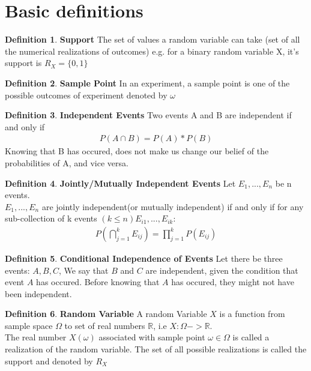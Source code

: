\documentclass[10pt,a4paper]{article}
\newcommand{\R}{\mathbb{R}}
\begin{document}
\theoremstyle{definition}
\newtheorem{defn}{Definition}[section]


	\section{Basic definitions}

	\begin{defn}{\textbf{Support}}
		The set of values a random variable can take (set of all the numerical realizations of outcomes) e.g. for a binary random variable X, it's support is $R_X = \{ 0, 1 \}$
	\end{defn}


	\begin{defn}{\textbf{Sample Point}}
		In an experiment, a sample point is one of the possible outcomes of experiment denoted by $\omega$
	\end{defn}

	\begin{defn}{\textbf{Independent Events}}
	Two events A and B are independent if and only if \\
	\begin{align}
		P(A \cap B) = P(A) * P(B)
	\end{align}
	Knowing that B has occured, does not make us change our belief of the probabilities of A, and vice versa.
	\end{defn}

	\begin{defn}{\textbf{Jointly/Mutually Independent Events}}
	Let $E_1, ... , E_n$ be n events. \\
	$E_1, ... , E_n$ are jointly independent(or mutually independent)
	if and only if for any sub-collection of k events $(k \leq n) E_{i1}, ... , E_{ik}$:
	\begin{align}
	P(\bigcap \limits_{j=1}^kE_{ij}) = \prod_{j=1}^{k}P(E_{ij})
	\end{align}
	\end{defn}

	\begin{defn}{\textbf{Conditional Independence of Events}}
		Let there be three events: $A, B, C$,
		We say that $B$ and $C$ are independent, given the condition that event $A$ has occured.
		Before knowing that $A$ has occured, they might not have been independent.
	\end{defn}

	\begin{defn}{\textbf{Random Variable}}
		A random Variable $X$ is a function from sample space $\Omega$ to set of real numbers $\R$, i.e $ X: \Omega -> \R $.\\
		
		The real number $X(\omega)$ associated with sample point $\omega \in \Omega$ is called a realization of the random variable. The set of all possible realizations is called the support and denoted by $R_X$
	\end{defn}
\end{document}
